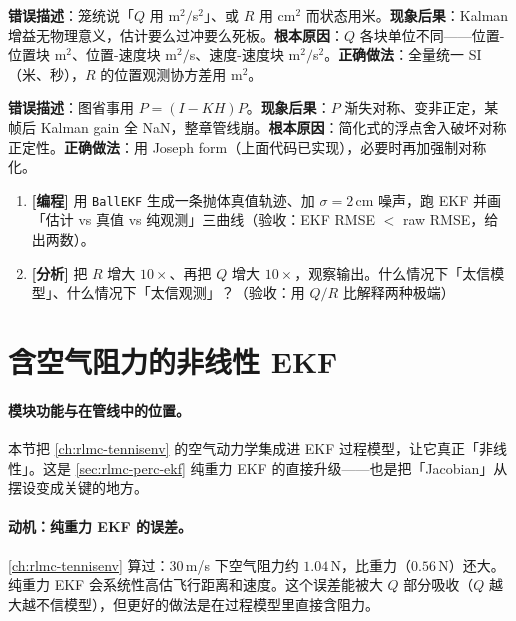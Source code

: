 \begin{pitfall}
\textbf{错误描述}：笼统说「$Q$ 用 m$^2/$s$^2$」、或 $R$ 用 cm$^2$ 而状态用米。\textbf{现象后果}：Kalman 增益无物理意义，估计要么过冲要么死板。\textbf{根本原因}：$Q$ 各块单位不同——位置-位置块 m$^2$、位置-速度块 m$^2/$s、速度-速度块 m$^2/$s$^2$。\textbf{正确做法}：全量统一 SI（米、秒），$R$ 的位置观测协方差用 m$^2$。
\end{pitfall}

\begin{pitfall}
\textbf{错误描述}：图省事用 $P=(I-KH)P$。\textbf{现象后果}：$P$ 渐失对称、变非正定，某帧后 Kalman gain 全 NaN，整章管线崩。\textbf{根本原因}：简化式的浮点舍入破坏对称正定性。\textbf{正确做法}：用 Joseph form（上面代码已实现），必要时再加强制对称化。
\end{pitfall}

\begin{practice}[本节动手任务]
\begin{enumerate}
  \item \textbf{[编程]} 用 \verb|BallEKF| 生成一条抛体真值轨迹、加 $\sigma=2$\,cm 噪声，跑 EKF 并画「估计 vs 真值 vs 纯观测」三曲线（验收：EKF RMSE $<$ raw RMSE，给出两数）。
  \item \textbf{[分析]} 把 $R$ 增大 $10\times$、再把 $Q$ 增大 $10\times$，观察输出。什么情况下「太信模型」、什么情况下「太信观测」？（验收：用 $Q/R$ 比解释两种极端）
\end{enumerate}
\end{practice}

\section{含空气阻力的非线性 EKF}
\label{sec:rlmc-perc-drag}

\paragraph{模块功能与在管线中的位置。}本节把 \cref{ch:rlmc-tennisenv} 的空气动力学集成进 EKF 过程模型，让它真正「非线性」。这是 \cref{sec:rlmc-perc-ekf} 纯重力 EKF 的直接升级——也是把「Jacobian」从摆设变成关键的地方。

\paragraph{动机：纯重力 EKF 的误差。}\cref{ch:rlmc-tennisenv} 算过：$30$\,m/s 下空气阻力约 $1.04$\,N，比重力（$0.56$\,N）还大。纯重力 EKF 会系统性高估飞行距离和速度。这个误差能被大 $Q$ 部分吸收（$Q$ 越大越不信模型），但更好的做法是在过程模型里直接含阻力。

